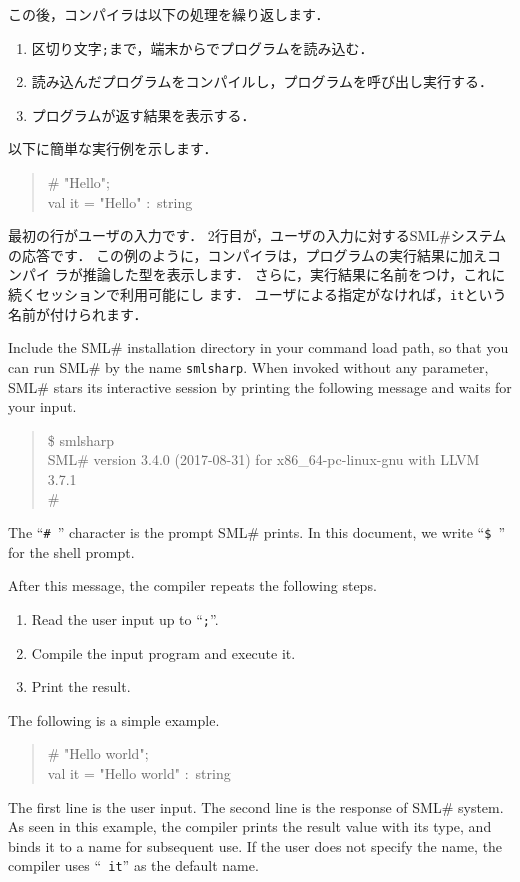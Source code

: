 \documentclass{jbook}
\newcommand{\smlsharp}{SML\#}
\newcommand{\version}{3.4.0}
\newcommand{\releaseDate}{2017-08-31}
\newenvironment{program}{\begin{quote}\begin{tt}}%
                        {\end{tt}\end{quote}}
\begin{document}
	この後，コンパイラは以下の処理を繰り返します．
\begin{enumerate}
\item 区切り文字{\tt ;}まで，端末からでプログラムを読み込む．
\item 読み込んだプログラムをコンパイルし，プログラムを呼び出し実行する．
\item プログラムが返す結果を表示する．
\end{enumerate}
	以下に簡単な実行例を示します．
\begin{tt}
\begin{quote}
\# "Hello";\\
val it = "Hello" :~string
\end{quote}
\end{tt}
	最初の行がユーザの入力です．
	2行目が，ユーザの入力に対する\smlsharp{}システムの応答です．
	この例のように，コンパイラは，プログラムの実行結果に加えコンパイ
ラが推論した型を表示します．
	さらに，実行結果に名前をつけ，これに続くセッションで利用可能にし
ます．
	ユーザによる指定がなければ，{\tt it}という名前が付けられます．
\else%

	Include the \smlsharp{} installation directory in your command
load path,  so that you can run \smlsharp{} by the name {\tt smlsharp}.
	When invoked without any parameter, \smlsharp{} stars its
interactive session by printing the following message and waits for your
input.
\begin{program}
\$ smlsharp\\
SML\# version \version{} (\releaseDate{}) for x86\_64-pc-linux-gnu with LLVM 3.7.1\\
\# 
\end{program}
	The ``{\tt \#\ }'' character is the prompt \smlsharp{}
prints.
	In this document, we write ``{\tt \$\ }'' for the 
shell prompt.

	After this message, the compiler repeats the following steps. 
\begin{enumerate}
\item Read the user input up to ``{\tt ;}''.
\item Compile the input program and execute it.
\item Print the result.
\end{enumerate}
	The following is a simple example.
\begin{tt}
\begin{quote}
\# "Hello world";\\
val it = "Hello world" :~string
\end{quote}
\end{tt}
	The first line is the user input.
	The second line is the response of \smlsharp{} system.
	As seen in this example, the compiler prints the result value with
its type, and binds it to a name for subsequent use.
	If the user does not specify the name, the compiler uses  ``{\tt
it}'' as the default name.
\end{document}
